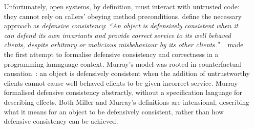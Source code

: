 





Unfortunately, open systems, by definition, must interact with
untrusted code: they cannot rely on callers' obeying method
preconditions. 
\cite{miller-esop2013,MillerPhD} define the necessary approach as
\textit{defensive consistency}: \textit{``An object is defensively
  consistent when it can defend its own invariants and provide correct
  service to its well behaved clients, despite arbitrary or malicious
  misbehaviour by its other clients.''}
~\cite{Murray10dphil} made the first attempt to formalise defensive consistency and
 correctness in a programming lamnguage context.  Murray's model was rooted in
counterfactual causation~\cite{Lewis_73}: an object is defensively
consistent when the addition of untrustworthy clients cannot cause
well-behaved clients to be given incorrect service.  Murray formalised
defensive consistency %
abstractly, 
without a specification language for describing effects.
Both Miller and
Murray's definitions are intensional, describing what it means for an
object to be defensively consistent, rather than how defensive
consistency can be achieved.





